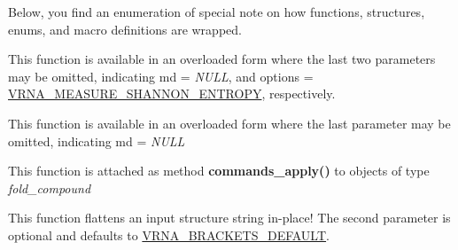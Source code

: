 Below, you find an enumeration of special note on how functions, structures, enums, and macro definitions are wrapped.


\begin{DoxyRefList}
\item[\label{wrappers__wrappers000002}%
\Hypertarget{wrappers__wrappers000002}%
Global \hyperlink{group__aln__utils_gaa12b481a7e7b965ef2eb1bcc4399e759}{vrna\+\_\+aln\+\_\+conservation\+\_\+col} (const char $\ast$$\ast$alignment, const vrna\+\_\+md\+\_\+t $\ast$md\+\_\+p, unsigned int options)]This function is available in an overloaded form where the last two parameters may be omitted, indicating {\ttfamily md} = {\itshape N\+U\+LL}, and {\ttfamily options} = \hyperlink{group__aln__utils_ga1e659227c9fc077d29989f576f129000}{V\+R\+N\+A\+\_\+\+M\+E\+A\+S\+U\+R\+E\+\_\+\+S\+H\+A\+N\+N\+O\+N\+\_\+\+E\+N\+T\+R\+O\+PY}, respectively.  
\item[\label{wrappers__wrappers000001}%
\Hypertarget{wrappers__wrappers000001}%
Global \hyperlink{group__aln__utils_gab6f16a2ea93f3bfd4d089cc8d448bb16}{vrna\+\_\+aln\+\_\+conservation\+\_\+struct} (const char $\ast$$\ast$alignment, const char $\ast$structure, const vrna\+\_\+md\+\_\+t $\ast$md)]This function is available in an overloaded form where the last parameter may be omitted, indicating {\ttfamily md} = {\itshape N\+U\+LL}  
\item[\label{wrappers__wrappers000005}%
\Hypertarget{wrappers__wrappers000005}%
Global \hyperlink{group__file__utils_ga5e993fc4b9602af73aaaab4d3b3cd9a9}{vrna\+\_\+commands\+\_\+apply} (vrna\+\_\+fold\+\_\+compound\+\_\+t $\ast$vc, vrna\+\_\+cmd\+\_\+t $\ast$commands, unsigned int options)]This function is attached as method {\bfseries commands\+\_\+apply()} to objects of type {\itshape fold\+\_\+compound}  
\item[\label{wrappers__wrappers000059}%
\Hypertarget{wrappers__wrappers000059}%
Global \hyperlink{group__struct__utils_gae966b9f44168a4f4b39ca42ffb5f37b7}{vrna\+\_\+db\+\_\+flatten} (char $\ast$structure, unsigned int options)]This function flattens an input structure string in-\/place! The second parameter is optional and defaults to \hyperlink{group__struct__utils_ga559ebf76b1b289f85309f4206e99aa1a}{V\+R\+N\+A\+\_\+\+B\+R\+A\+C\+K\+E\+T\+S\+\_\+\+D\+E\+F\+A\+U\+LT}.


\end{DoxyRefList}
